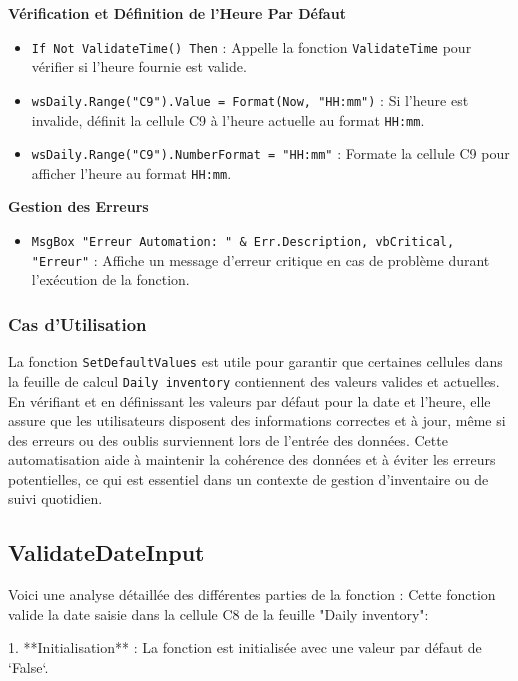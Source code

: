 \documentclass[a4paper, oneside, 12pt, final]{extreport}
\begin{document}
\textbf{Vérification et Définition de l'Heure Par Défaut}

\begin{itemize}
    \item \texttt{If Not ValidateTime() Then} : Appelle la fonction \texttt{ValidateTime} pour vérifier si l'heure fournie est valide.
    \item \texttt{wsDaily.Range("C9").Value = Format(Now, "HH:mm")} : Si l'heure est invalide, définit la cellule C9 à l'heure actuelle au format \texttt{HH:mm}.
    \item \texttt{wsDaily.Range("C9").NumberFormat = "HH:mm"} : Formate la cellule C9 pour afficher l'heure au format \texttt{HH:mm}.
\end{itemize}

\textbf{Gestion des Erreurs}

\begin{itemize}
    \item \texttt{MsgBox "Erreur Automation: " \& Err.Description, vbCritical, "Erreur"} : Affiche un message d'erreur critique en cas de problème durant l'exécution de la fonction.
\end{itemize}

\subsubsection{Cas d'Utilisation}

La fonction \texttt{SetDefaultValues} est utile pour garantir que certaines cellules dans la feuille de calcul \texttt{Daily inventory} contiennent des valeurs valides et actuelles. En vérifiant et en définissant les valeurs par défaut pour la date et l'heure, elle assure que les utilisateurs disposent des informations correctes et à jour, même si des erreurs ou des oublis surviennent lors de l'entrée des données. Cette automatisation aide à maintenir la cohérence des données et à éviter les erreurs potentielles, ce qui est essentiel dans un contexte de gestion d'inventaire ou de suivi quotidien.
\subsection{ValidateDateInput}

Voici une analyse détaillée des différentes parties de la fonction :
Cette fonction valide la date saisie dans la cellule C8 de la feuille "Daily inventory":

1. **Initialisation** : La fonction est initialisée avec une valeur par défaut de `False`.
\end{document}
